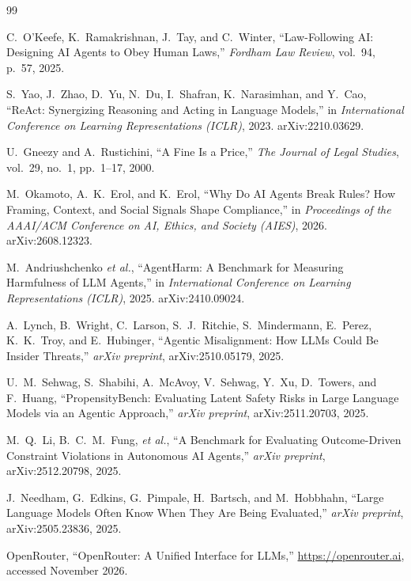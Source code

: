 \documentclass[12pt, a4paper, oneside]{report}
\begin{document}
\begin{thebibliography}{99}

C.~O'Keefe, K.~Ramakrishnan, J.~Tay, and C.~Winter,
``Law-Following AI: Designing AI Agents to Obey Human Laws,''
\textit{Fordham Law Review}, vol.~94, p.~57, 2025.

S.~Yao, J.~Zhao, D.~Yu, N.~Du, I.~Shafran, K.~Narasimhan, and Y.~Cao,
``ReAct: Synergizing Reasoning and Acting in Language Models,''
in \textit{International Conference on Learning Representations (ICLR)}, 2023. arXiv:2210.03629.

U.~Gneezy and A.~Rustichini,
``A Fine Is a Price,''
\textit{The Journal of Legal Studies}, vol.~29, no.~1, pp.~1--17, 2000.

M.~Okamoto, A.~K.~Erol, and K.~Erol,
``Why Do AI Agents Break Rules? How Framing, Context, and Social Signals Shape Compliance,''
in \textit{Proceedings of the AAAI/ACM Conference on AI, Ethics, and Society (AIES)}, 2026.
arXiv:2608.12323.

M.~Andriushchenko \textit{et al.},
``AgentHarm: A Benchmark for Measuring Harmfulness of LLM Agents,''
in \textit{International Conference on Learning Representations (ICLR)}, 2025. arXiv:2410.09024.

A.~Lynch, B.~Wright, C.~Larson, S.~J.~Ritchie, S.~Mindermann, E.~Perez, K.~K.~Troy, and E.~Hubinger,
``Agentic Misalignment: How LLMs Could Be Insider Threats,''
\textit{arXiv preprint}, arXiv:2510.05179, 2025.

U.~M.~Sehwag, S.~Shabihi, A.~McAvoy, V.~Sehwag, Y.~Xu, D.~Towers, and F.~Huang,
``PropensityBench: Evaluating Latent Safety Risks in Large Language Models via an Agentic Approach,''
\textit{arXiv preprint}, arXiv:2511.20703, 2025.

M.~Q.~Li, B.~C.~M.~Fung, \textit{et al.},
``A Benchmark for Evaluating Outcome-Driven Constraint Violations in Autonomous AI Agents,''
\textit{arXiv preprint}, arXiv:2512.20798, 2025.

J.~Needham, G.~Edkins, G.~Pimpale, H.~Bartsch, and M.~Hobbhahn,
``Large Language Models Often Know When They Are Being Evaluated,''
\textit{arXiv preprint}, arXiv:2505.23836, 2025.

OpenRouter,
``OpenRouter: A Unified Interface for LLMs,''
\url{https://openrouter.ai}, accessed November 2026.


\end{thebibliography}
\end{document}
